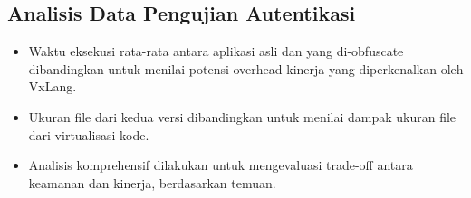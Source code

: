 \subsection{Analisis Data Pengujian Autentikasi}
\begin{itemize}
	\item {} Waktu eksekusi rata-rata antara aplikasi asli dan yang di-obfuscate dibandingkan untuk menilai potensi overhead kinerja yang diperkenalkan oleh VxLang.
	\item {} Ukuran file dari kedua versi dibandingkan untuk menilai dampak ukuran file dari virtualisasi kode.
	\item {} Analisis komprehensif dilakukan untuk mengevaluasi trade-off antara keamanan dan kinerja, berdasarkan temuan.
\end{itemize}

